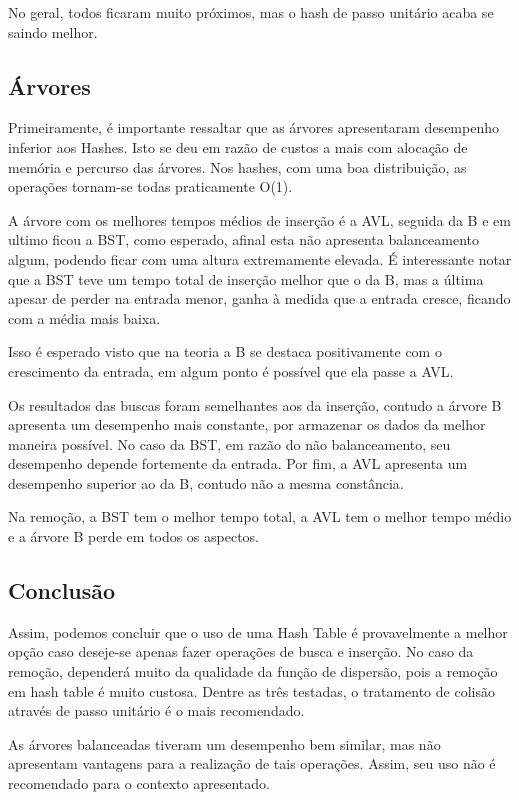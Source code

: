 \documentclass[twoside]{article}
\begin{document}
\begin{multicols}{2}
\indent	No geral, todos ficaram muito próximos, mas o hash de passo unitário acaba se saindo melhor.

\subsection{Árvores}
\indent Primeiramente, é importante ressaltar que as árvores apresentaram desempenho inferior aos Hashes. Isto se deu em razão de custos a mais com alocação de memória e percurso das árvores. Nos hashes, com uma boa distribuição, as operações tornam-se todas praticamente O(1).

\indent A árvore com os melhores tempos médios de inserção é a AVL, seguida da B e em ultimo ficou a BST, como esperado, afinal esta não apresenta balanceamento algum, podendo ficar com uma altura extremamente elevada. É interessante notar que a BST teve um tempo total de inserção melhor que o da B, mas a última apesar de perder na entrada menor, ganha à medida que a entrada cresce, ficando com a média mais baixa. 

\indent	Isso é esperado visto que na teoria a B se destaca positivamente com o crescimento da entrada, em algum ponto é possível que ela passe a AVL.

\indent	Os resultados das buscas foram semelhantes aos da inserção, contudo a árvore B apresenta um desempenho mais constante, por armazenar os dados da melhor maneira possível. No caso da BST, em razão do não balanceamento, seu desempenho depende fortemente da entrada. Por fim, a AVL apresenta um desempenho superior ao da B, contudo não a mesma constância.

\indent	Na remoção, a BST tem o melhor tempo total, a AVL tem o melhor tempo médio e a árvore B perde em todos os aspectos. 

\subsection{Conclusão}
\indent	Assim, podemos concluir que o uso de uma Hash Table é provavelmente a melhor opção caso deseje-se apenas fazer operações de busca e inserção. No caso da remoção, dependerá muito da qualidade da função de dispersão, pois a remoção em hash table é muito custosa. Dentre as três testadas, o tratamento de colisão através de passo unitário é o mais recomendado.

\indent	As árvores balanceadas tiveram um desempenho bem similar, mas não apresentam vantagens para a realização de tais operações. Assim, seu uso não é recomendado para o contexto apresentado.
	

\end{multicols}
\end{document}
